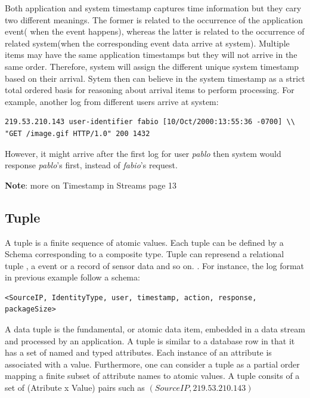 Both application and system timestamp captures time information but they cary two different meanings. The former is related to the occurrence of the application event( when the event happens), whereas the latter is related to the occurrence of related system(when the corresponding event data arrive at system). Multiple items may have the same application timestamps but they will not arrive in the same order. Therefore, system will assign the different unique system timestamp based on their arrival. Sytem then can believe in the system timestamp as a strict total ordered basis for reasoning about arrival items to perform processing. For example, another log from different users arrive at system:
\begin{verbatim}
219.53.210.143 user-identifier fabio [10/Oct/2000:13:55:36 -0700] \\
"GET /image.gif HTTP/1.0" 200 1432
\end{verbatim}
However, it might arrive after the first log for user \textit{pablo} then system would response \textit{pablo}'s first, instead of \textit{fabio}'s request.

\textbf{Note}: more on Timestamp in Streams \citep{Babcock:2002} page 13

\subsection*{Tuple}
A tuple is a finite sequence of atomic values. Each tuple can be defined by a Schema corresponding to a composite type. Tuple can represend a relational tuple , a event or a record of sensor data and so on. \citep{Arasu:2006:CCQ}. For instance, the log format in previous example follow a schema:

\begin{verbatim}
<SourceIP, IdentityType, user, timestamp, action, response, packageSize>
\end{verbatim}

A data tuple is the fundamental, or atomic data item, embedded in a data stream and processed by an application. A tuple is similar to a database row in that it has a set of named and typed attributes. Each instance of an attribute is associated with a value\citep{Henrique:2014}. Furthermore, one can consider a tuple as a partial order mapping a finite subset of attribute names to atomic values\citep{Petit:2012}. A tuple consits of a set of (Atribute x Value) pairs such as $(SourceIP, 219.53.210.143)$



